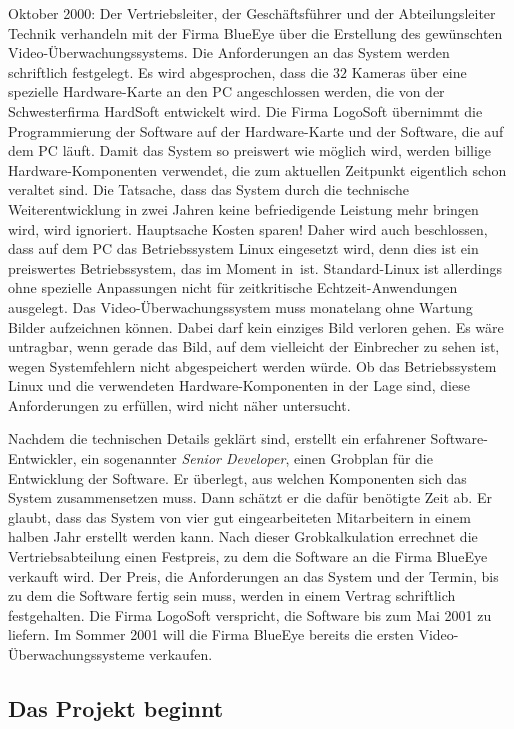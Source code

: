 Oktober 2000: Der Vertriebsleiter, der Geschäftsführer und der
Abteilungsleiter Technik verhandeln mit der Firma BlueEye über die Erstellung
des gewünschten Video-Überwachungssystems. Die Anforderungen an das System
werden schriftlich festgelegt. Es wird abgesprochen, dass die $32$ Kameras über
eine spezielle Hardware-Karte an den PC angeschlossen werden, die von der
Schwesterfirma HardSoft entwickelt wird. Die Firma LogoSoft übernimmt die
Programmierung der Software auf der Hardware-Karte und der Software, die auf
dem PC läuft. Damit das System so preiswert wie möglich wird, werden billige
Hardware-Komponenten verwendet, die zum aktuellen Zeitpunkt eigentlich schon
veraltet sind. Die Tatsache, dass das System durch die technische
Weiterentwicklung in zwei Jahren keine befriedigende Leistung mehr bringen
wird, wird ignoriert. Hauptsache Kosten sparen! Daher wird auch beschlossen,
dass auf dem PC das Betriebssystem Linux eingesetzt wird, denn dies ist ein
preiswertes Betriebssystem, das im Moment \glqq in\grqq\ ist. Standard-Linux
ist allerdings ohne spezielle Anpassungen nicht für zeitkritische
Echtzeit-Anwendungen ausgelegt. Das Video-Überwachungssystem muss monatelang
ohne Wartung Bilder aufzeichnen können. Dabei darf kein einziges Bild verloren
gehen. Es wäre untragbar, wenn gerade das Bild, auf dem vielleicht der
Einbrecher zu sehen ist, wegen Systemfehlern nicht abgespeichert werden würde.
Ob das Betriebssystem Linux und die verwendeten Hardware-Komponenten in der
Lage sind, diese Anforderungen zu erfüllen, wird nicht näher untersucht.

Nachdem die technischen Details geklärt sind, erstellt ein erfahrener
Software-Entwickler, ein sogenannter {\em Senior Developer}, einen Grobplan für
die Entwicklung der Software. Er überlegt, aus welchen Komponenten sich das
System zusammensetzen muss. Dann schätzt er die dafür benötigte Zeit ab. Er
glaubt, dass das System von vier gut eingearbeiteten Mitarbeitern in einem
halben Jahr erstellt werden kann. Nach dieser Grobkalkulation errechnet die
Vertriebsabteilung einen Festpreis, zu dem die Software an die Firma BlueEye
verkauft wird. Der Preis, die Anforderungen an das System und der Termin, bis
zu dem die Software fertig sein muss, werden in einem Vertrag schriftlich
festgehalten. Die Firma LogoSoft verspricht, die Software bis zum Mai 2001 zu
liefern. Im Sommer 2001 will die Firma BlueEye bereits die ersten
Video-Überwachungssysteme verkaufen.

\subsection{Das Projekt beginnt}

